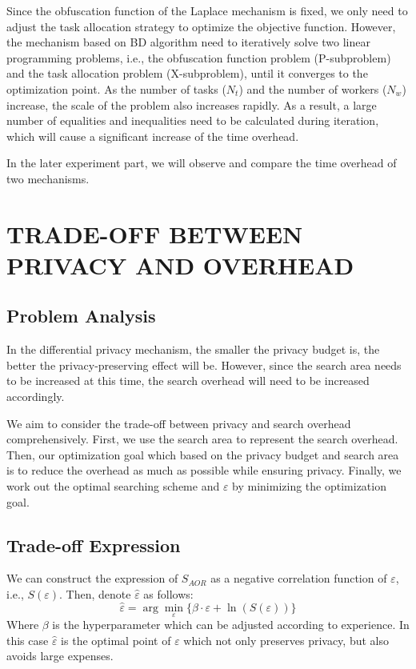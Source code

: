 Since the obfuscation function of the Laplace mechanism is fixed, we only need to adjust the task allocation strategy to optimize the objective function. However, the mechanism based on BD algorithm need to iteratively solve two linear programming problems, i.e., the obfuscation function problem (P-subproblem) and the task allocation problem (X-subproblem), until it converges to the optimization point. As the number of tasks ($N_t$) and the number of workers ($N_w$) increase, the scale of the problem also increases rapidly. As a result, a large number of equalities and inequalities need to be calculated during iteration, which will cause a significant increase of the time overhead.

In the later experiment part, we will observe and compare the time overhead of two mechanisms.

\section{TRADE-OFF BETWEEN PRIVACY AND OVERHEAD}
\subsection{Problem Analysis}
In the differential privacy mechanism, the smaller the privacy budget is, the better the privacy-preserving effect will be. However, since the search area needs to be increased at this time, the search overhead will need to be increased accordingly.

We aim to consider the trade-off between privacy and search overhead comprehensively. First, we use the search area to represent the search overhead. Then, our optimization goal which based on the privacy budget and search area is to reduce the overhead as much as possible while ensuring privacy. Finally, we work out the optimal searching scheme and $\varepsilon$ by minimizing the optimization goal.

\subsection{Trade-off Expression}
We can construct the expression of $S_{AOR}$ as a negative correlation function of $\varepsilon$, i.e., $S(\varepsilon)$. Then, denote $\hat{\varepsilon}$ as follows:
$$
	\hat{\varepsilon}=\arg \min_\varepsilon \{ \beta \cdot \varepsilon + \ln (S(\varepsilon)) \}
$$
Where $\beta$ is the hyperparameter which can be adjusted according to experience. In this case $\hat{\varepsilon}$ is the optimal point of $\varepsilon$ which not only preserves privacy, but also avoids large expenses.

